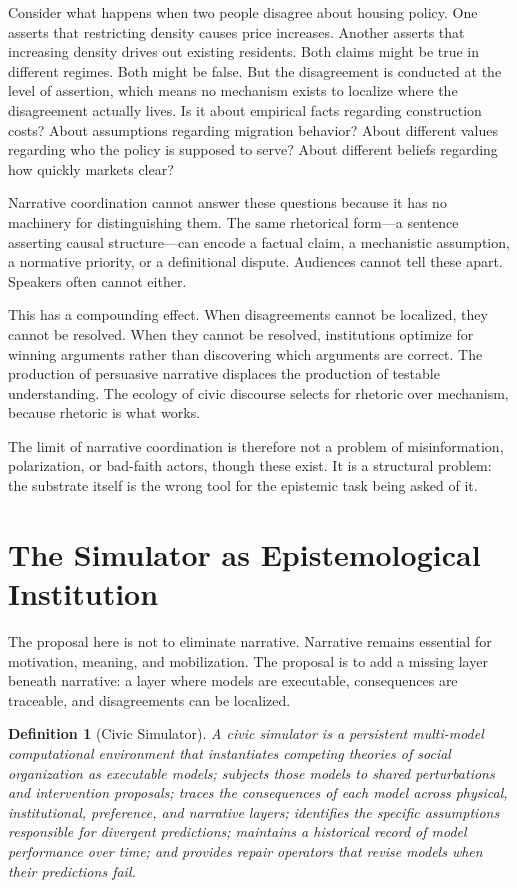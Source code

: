 \documentclass[12pt]{article}
\newtheorem{definition}{Definition}
\begin{document}
Consider what happens when two people disagree about housing policy. One asserts that restricting density causes price increases. Another asserts that increasing density drives out existing residents. Both claims might be true in different regimes. Both might be false. But the disagreement is conducted at the level of assertion, which means no mechanism exists to localize where the disagreement actually lives. Is it about empirical facts regarding construction costs? About assumptions regarding migration behavior? About different values regarding who the policy is supposed to serve? About different beliefs regarding how quickly markets clear?

Narrative coordination cannot answer these questions because it has no machinery for distinguishing them. The same rhetorical form---a sentence asserting causal structure---can encode a factual claim, a mechanistic assumption, a normative priority, or a definitional dispute. Audiences cannot tell these apart. Speakers often cannot either.

This has a compounding effect. When disagreements cannot be localized, they cannot be resolved. When they cannot be resolved, institutions optimize for winning arguments rather than discovering which arguments are correct. The production of persuasive narrative displaces the production of testable understanding. The ecology of civic discourse selects for rhetoric over mechanism, because rhetoric is what works.

The limit of narrative coordination is therefore not a problem of misinformation, polarization, or bad-faith actors, though these exist. It is a structural problem: the substrate itself is the wrong tool for the epistemic task being asked of it.

\section{The Simulator as Epistemological Institution}

The proposal here is not to eliminate narrative. Narrative remains essential for motivation, meaning, and mobilization. The proposal is to add a missing layer beneath narrative: a layer where models are executable, consequences are traceable, and disagreements can be localized.

\begin{definition}[Civic Simulator]
A civic simulator is a persistent multi-model computational environment that instantiates competing theories of social organization as executable models; subjects those models to shared perturbations and intervention proposals; traces the consequences of each model across physical, institutional, preference, and narrative layers; identifies the specific assumptions responsible for divergent predictions; maintains a historical record of model performance over time; and provides repair operators that revise models when their predictions fail.
\end{definition}
\end{document}
